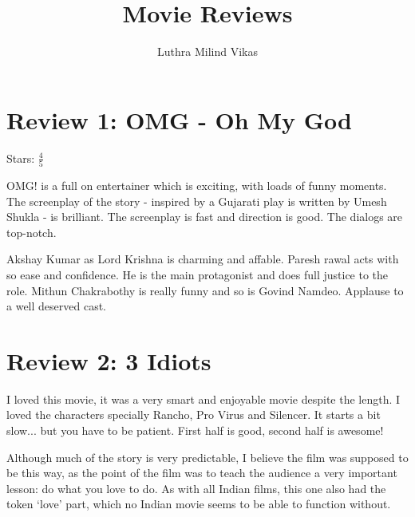 \documentclass{article}
\author{Luthra Milind Vikas}
\date{}
\title{Movie Reviews}
\begin{document}
\maketitle

\section{Review 1: OMG - Oh My God}

Stars: $\frac{4}{5}$


OMG! is a full on entertainer which is exciting, with loads of funny moments. The screenplay of the story - inspired by a Gujarati play is written by Umesh Shukla - is brilliant. The screenplay is fast and direction is good. The dialogs are top-notch.

Akshay Kumar as Lord Krishna is charming and affable. Paresh rawal acts with so ease and confidence. He is the main protagonist and does full justice to the role. Mithun Chakrabothy is really funny and so is Govind Namdeo. Applause to a well deserved cast.


\section{Review 2: 3 Idiots}

I loved this movie, it was a very smart and enjoyable movie despite the length. I loved the characters specially Rancho, Pro Virus and Silencer. It starts a bit slow... but you have to be patient. First half is good, second half is awesome!

Although much of the story is very predictable, I believe the film was supposed to be this way, as the point of the film was to teach the audience a very important lesson: do what you love to do. As with all Indian films, this one also had the token `love' part, which no Indian movie seems to be able to function without.


\end{document}
